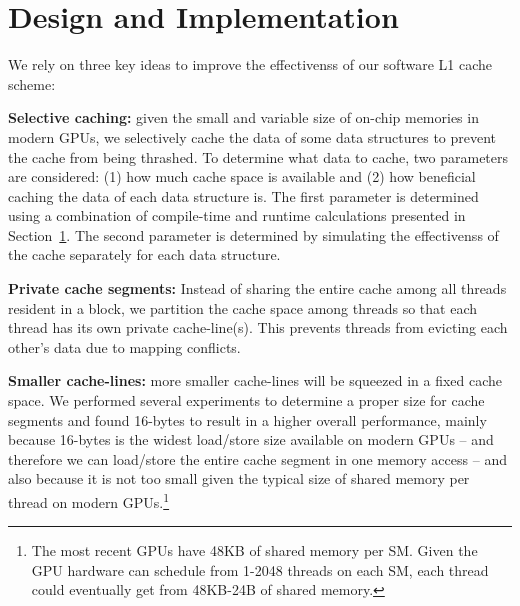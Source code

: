 \section{Design and Implementation}

We rely on three key ideas to improve the effectivenss of our software L1 cache scheme:

{\bf Selective caching:} given the small and variable size of on-chip memories in modern GPUs, we
selectively cache the data of some data structures to prevent the cache from being thrashed. To
determine what data to cache, two parameters are considered: (1) how much cache space is available
and (2) how beneficial caching the data of each data structure is. The first parameter is determined
using a combination of compile-time and runtime calculations presented in Section~\ref{}. The second
parameter is determined by simulating the effectivenss of the cache separately for each data
structure.


{\bf Private cache segments:} Instead of sharing the entire cache among all threads resident in a
block, we partition the cache space among threads so that each thread has its own private
cache-line(s). This prevents threads from evicting each other's data due to mapping conflicts.


{\bf Smaller cache-lines:} more smaller cache-lines will be squeezed in a fixed cache space. We
performed several experiments to determine a proper size for cache segments and found 16-bytes to
result in a higher overall performance, mainly because 16-bytes is the widest load/store size
available on modern GPUs -- and therefore we can load/store the entire cache segment in one memory
access -- and also because it is not too small given the typical size of shared memory per thread on
modern GPUs.\footnote{The most recent GPUs have 48KB of shared memory per SM. Given the GPU hardware
can schedule from 1-2048 threads on each SM, each thread could eventually get from 48KB-24B of
shared memory.} 


